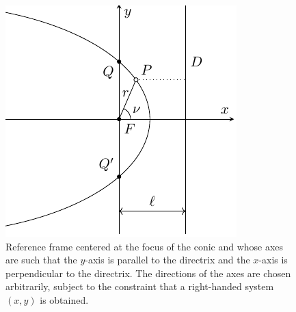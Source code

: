 \documentclass[../main.tex]{subfiles}
\begin{document}
\begin{figure}[htbp]
\begin{minipage}[t]{0.45\textwidth}
    \includegraphics[width=\textwidth]{Images/conics.pdf}
    \caption{Reference frame centered at the focus of the conic and whose axes are such that the $y$-axis is parallel to the directrix and the $x$-axis is perpendicular to the directrix. The directions of the axes are chosen arbitrarily, subject to the constraint that a right-handed system $(x,y)$ is obtained.}
    \label{fig:conics_cartesian}
  \end{minipage}
\end{figure}
\end{document}
